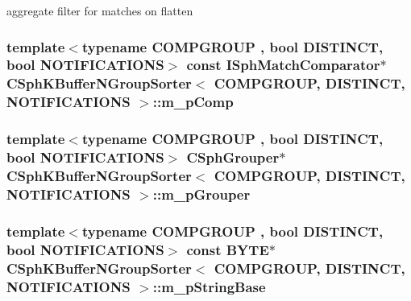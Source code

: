 aggregate filter for matches on flatten 

\hypertarget{classCSphKBufferNGroupSorter_ad83276c004fa80329903c903b6b2fcba}{
\subsubsection[{m\-\_\-p\-Comp}]{\setlength{\rightskip}{0pt plus 5cm}template$<$typename C\-O\-M\-P\-G\-R\-O\-U\-P , bool D\-I\-S\-T\-I\-N\-C\-T, bool N\-O\-T\-I\-F\-I\-C\-A\-T\-I\-O\-N\-S$>$ const {\bf I\-Sph\-Match\-Comparator}$\ast$ {\bf C\-Sph\-K\-Buffer\-N\-Group\-Sorter}$<$ C\-O\-M\-P\-G\-R\-O\-U\-P, D\-I\-S\-T\-I\-N\-C\-T, N\-O\-T\-I\-F\-I\-C\-A\-T\-I\-O\-N\-S $>$\-::m\-\_\-p\-Comp\hspace{0.3cm}{\ttfamily [protected]}}}\label{classCSphKBufferNGroupSorter_ad83276c004fa80329903c903b6b2fcba}
\hypertarget{classCSphKBufferNGroupSorter_af29b813107bc037f605aae36be5cd895}{
\subsubsection[{m\-\_\-p\-Grouper}]{\setlength{\rightskip}{0pt plus 5cm}template$<$typename C\-O\-M\-P\-G\-R\-O\-U\-P , bool D\-I\-S\-T\-I\-N\-C\-T, bool N\-O\-T\-I\-F\-I\-C\-A\-T\-I\-O\-N\-S$>$ {\bf C\-Sph\-Grouper}$\ast$ {\bf C\-Sph\-K\-Buffer\-N\-Group\-Sorter}$<$ C\-O\-M\-P\-G\-R\-O\-U\-P, D\-I\-S\-T\-I\-N\-C\-T, N\-O\-T\-I\-F\-I\-C\-A\-T\-I\-O\-N\-S $>$\-::m\-\_\-p\-Grouper\hspace{0.3cm}{\ttfamily [protected]}}}\label{classCSphKBufferNGroupSorter_af29b813107bc037f605aae36be5cd895}
\hypertarget{classCSphKBufferNGroupSorter_a9679071285ab6114a04d2dcc628606ca}{
\subsubsection[{m\-\_\-p\-String\-Base}]{\setlength{\rightskip}{0pt plus 5cm}template$<$typename C\-O\-M\-P\-G\-R\-O\-U\-P , bool D\-I\-S\-T\-I\-N\-C\-T, bool N\-O\-T\-I\-F\-I\-C\-A\-T\-I\-O\-N\-S$>$ const {\bf B\-Y\-T\-E}$\ast$ {\bf C\-Sph\-K\-Buffer\-N\-Group\-Sorter}$<$ C\-O\-M\-P\-G\-R\-O\-U\-P, D\-I\-S\-T\-I\-N\-C\-T, N\-O\-T\-I\-F\-I\-C\-A\-T\-I\-O\-N\-S $>$\-::m\-\_\-p\-String\-Base\hspace{0.3cm}{\ttfamily [protected]}}}\label{classCSphKBufferNGroupSorter_a9679071285ab6114a04d2dcc628606ca}
